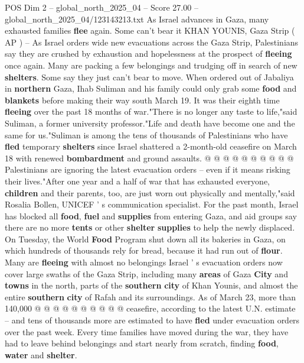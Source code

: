 \begin{textsample}{POS Dim 2 – global\_north\_2025\_04 – Score 27.00 – global\_north\_2025\_04/123143213.txt}  \label{ex:f2_pos_325}
As Israel advances in Gaza, many exhausted families \textbf{flee} again.
Some can't bear it KHAN YOUNIS, Gaza Strip ( AP ) -- As Israel orders wide new evacuations across the Gaza Strip, Palestinians say they are crushed by exhaustion and hopelessness at the prospect of \textbf{fleeing} once again.
Many are packing a few belongings and trudging off in search of new \textbf{shelters}.
Some say they just can't bear to move.
When ordered out of Jabaliya in \textbf{northern} Gaza, Ihab Suliman and his family could only grab some \textbf{food} and \textbf{blankets} before making their way south March 19.
It was their eighth time \textbf{fleeing} over the past 18 months of war."There is no longer any taste to life,"said Suliman, a former university professor."Life and death have become one and the same for us."Suliman is among the tens of thousands of Palestinians who have \textbf{fled} temporary \textbf{shelters} since Israel shattered a 2-month-old ceasefire on March 18 with renewed \textbf{bombardment} and ground assaults. @ @ @ @ @ @ @ @ @ @ Palestinians are ignoring the latest evacuation orders -- even if it means risking their lives."After one year and a half of war that has exhausted everyone, \textbf{children} and their parents, too, are just worn out physically and mentally,"said Rosalia Bollen, UNICEF ' s communication specialist.
For the past month, Israel has blocked all \textbf{food}, \textbf{fuel} and \textbf{supplies} from entering Gaza, and aid groups say there are no more \textbf{tents} or other \textbf{shelter} \textbf{supplies} to help the newly displaced.
On Tuesday, the World \textbf{Food} Program shut down all its bakeries in Gaza, on which hundreds of thousands rely for bread, because it had run out of \textbf{flour}.
Many are \textbf{fleeing} with almost no belongings Israel ' s evacuation orders now cover large swaths of the Gaza Strip, including many \textbf{areas} of Gaza \textbf{City} and \textbf{towns} in the north, parts of the \textbf{southern} \textbf{city} of Khan Younis, and almost the entire \textbf{southern} \textbf{city} of Rafah and its surroundings.
As of March 23, more than 140,000 @ @ @ @ @ @ @ @ @ @ ceasefire, according to the latest U.N. estimate -- and tens of thousands more are estimated to have \textbf{fled} under evacuation orders over the past week.
Every time families have moved during the war, they have had to leave behind belongings and start nearly from scratch, finding \textbf{food}, \textbf{water} and \textbf{shelter}.

\end{textsample}

